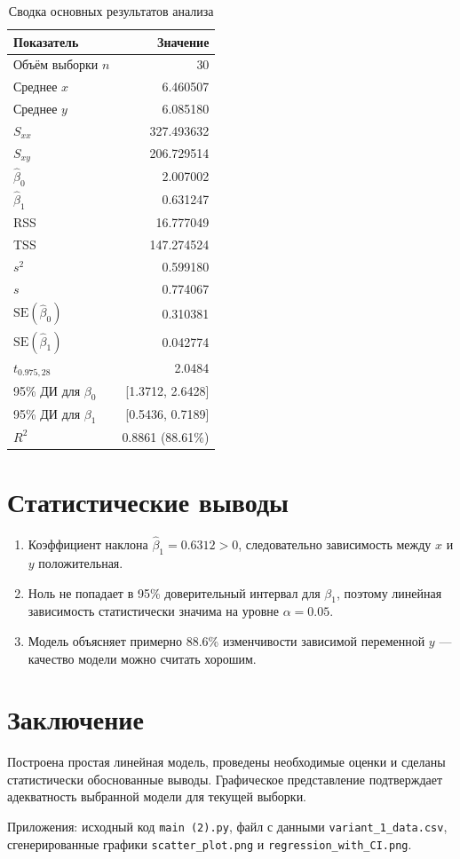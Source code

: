 \documentclass[12pt,a4paper]{article}
\begin{document}
\begin{table}[ht]
\centering
\begin{tabular}{|l|r|}
\hline
\textbf{Показатель} & \textbf{Значение} \\
\hline
Объём выборки $n$ & 30 \\
Среднее $x$ & 6.460507 \\
Среднее $y$ & 6.085180 \\
$S_{xx}$ & 327.493632 \\
$S_{xy}$ & 206.729514 \\
\hline
$\hat{\beta}_0$ & 2.007002 \\
$\hat{\beta}_1$ & 0.631247 \\
\hline
RSS & 16.777049 \\
TSS & 147.274524 \\
$s^2$ & 0.599180 \\
$s$ & 0.774067 \\
\hline
$\text{SE}(\hat{\beta}_0)$ & 0.310381 \\
$\text{SE}(\hat{\beta}_1)$ & 0.042774 \\
$t_{0.975, 28}$ & 2.0484 \\
\hline
95\% ДИ для $\beta_0$ & [1.3712, 2.6428] \\
95\% ДИ для $\beta_1$ & [0.5436, 0.7189] \\
\hline
$R^2$ & 0.8861 (88.61\%) \\
\hline
\end{tabular}
\caption{Сводка основных результатов анализа}
\end{table}

\section{Статистические выводы}
\begin{enumerate}
\item Коэффициент наклона $\hat{\beta}_1 = 0.6312 > 0$, следовательно зависимость между $x$ и $y$ положительная.
\item Ноль не попадает в 95\% доверительный интервал для $\beta_1$, поэтому линейная зависимость статистически значима на уровне $\alpha=0.05$.
\item Модель объясняет примерно 88.6\% изменчивости зависимой переменной $y$ — качество модели можно считать хорошим.
\end{enumerate}

\section*{Заключение}
Построена простая линейная модель, проведены необходимые оценки и сделаны статистически обоснованные выводы. Графическое представление подтверждает адекватность выбранной модели для текущей выборки.

\vspace{10mm}
\noindent Приложения: исходный код \texttt{main (2).py}, файл с данными \texttt{variant_1_data.csv}, сгенерированные графики \texttt{scatter_plot.png} и \texttt{regression_with_CI.png}.
\end{document}
